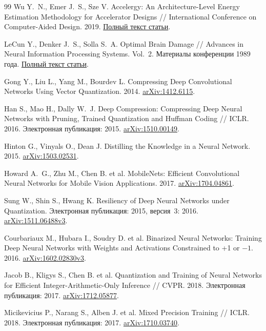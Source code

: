 \begin{thebibliography}{99}
Wu Y.~N., Emer J.~S., Sze V.
Accelergy: An Architecture-Level Energy Estimation Methodology for
Accelerator Designs // International Conference on Computer-Aided Design.
2019.
\href{https://d1qx31qr3h6wln.cloudfront.net/publications/ICCAD_2019_Accelergy.pdf}{Полный текст статьи}.

LeCun Y., Denker J.~S., Solla S.~A.
Optimal Brain Damage // Advances in Neural Information Processing Systems.
Vol.~2. Материалы конференции 1989 года.
\href{https://proceedings.neurips.cc/paper_files/paper/1989/file/6c9882bbac1c7093bd25041881277658-Paper.pdf}{Полный текст статьи}.

Gong Y., Liu L., Yang M., Bourdev L.
Compressing Deep Convolutional Networks Using Vector Quantization.
2014. \href{https://arxiv.org/abs/1412.6115}{arXiv:1412.6115}.

Han S., Mao H., Dally W.~J.
Deep Compression: Compressing Deep Neural Networks with Pruning,
Trained Quantization and Huffman Coding // ICLR. 2016.
Электронная публикация: 2015.
\href{https://arxiv.org/abs/1510.00149}{arXiv:1510.00149}.

Hinton G., Vinyals O., Dean J.
Distilling the Knowledge in a Neural Network. 2015.
\href{https://arxiv.org/abs/1503.02531}{arXiv:1503.02531}.

Howard A.~G., Zhu M., Chen B. et al.
MobileNets: Efficient Convolutional Neural Networks for Mobile Vision
Applications. 2017.
\href{https://arxiv.org/abs/1704.04861}{arXiv:1704.04861}.

Sung W., Shin S., Hwang K.
Resiliency of Deep Neural Networks under Quantization.
Электронная публикация: 2015, версия~3: 2016.
\href{https://arxiv.org/abs/1511.06488v3}{arXiv:1511.06488v3}.

Courbariaux M., Hubara I., Soudry D. et al.
Binarized Neural Networks: Training Deep Neural Networks with Weights
and Activations Constrained to +1 or $-1$.
2016. \href{https://arxiv.org/abs/1602.02830v3}{arXiv:1602.02830v3}.

Jacob B., Kligys S., Chen B. et al.
Quantization and Training of Neural Networks for Efficient
Integer-Arithmetic-Only Inference // CVPR. 2018. Электронная публикация: 2017.
\href{https://arxiv.org/abs/1712.05877}{arXiv:1712.05877}.

Micikevicius P., Narang S., Alben J. et al.
Mixed Precision Training // ICLR. 2018. Электронная публикация: 2017.
\href{https://arxiv.org/abs/1710.03740}{arXiv:1710.03740}.


\end{thebibliography}
